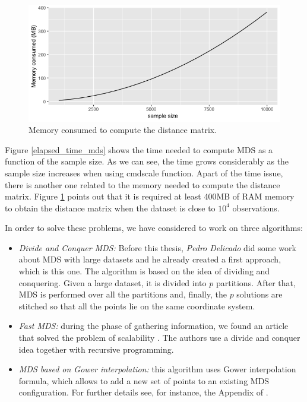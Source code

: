 \documentclass[11pt]{report}
\begin{document}
\begin{figure}[!ht]
\centering
\includegraphics[scale = 0.5]{./images/memory_distance.png}
\caption{Memory consumed to compute the distance matrix.}
\label{memory_distance}
\end{figure}


\indent Figure \ref{elapsed_time_mds} shows the time needed to compute MDS
as a function of the sample size. As we can see, the time grows 
considerably as the sample size increases when using \textsf{cmdscale} function. 
Apart of the time issue, there is another one related to the memory needed to 
compute the distance matrix. Figure \ref{memory_distance} points out 
that it is required at least 400MB of RAM memory to obtain the distance matrix 
when the dataset is close to $10^4$ observations.

\indent In order to solve these problems, we have considered to work on 
three algorithms:


\begin{itemize}
\item \textit{Divide and Conquer MDS:} Before this thesis, 
\textit{Pedro Delicado} did some work about  MDS with large
datasets and he already created a first approach, which is this one. The 
algorithm is based on the idea of dividing and conquering. Given a large 
dataset, it is divided into $p$ partitions. After that, MDS is performed 
over all the partitions and, finally, the $p$ solutions are stitched so that 
all the points lie on the same coordinate system.

\item \textit{Fast MDS:} during the phase of gathering information, we found an 
article that solved the problem of scalability \cite{Yang06afast}. The 
authors  use a divide and conquer idea together with recursive programming. 

\item \textit{MDS based on Gower interpolation:} this algorithm uses
Gower interpolation formula, which allows to add a new set of points
to an existing MDS configuration. For further details see, for instance, the 
Appendix of \cite{gowerformula}. 

\end{itemize}
\end{document}
